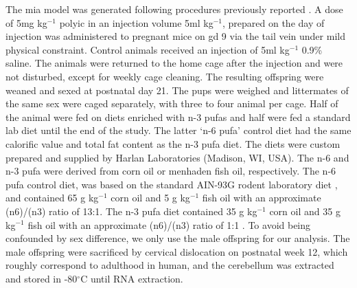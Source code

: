 The \gls{mia} model was generated following procedures previously reported \citep{Li2009c}. 
A dose of 5mg kg$^{-1}$ \gls{polyic} in an injection volume 5ml kg$^{-1}$, prepared on the day of injection was administered to pregnant mice on \gls{gd} 9 via the tail vein under mild physical constraint. 
Control animals received an injection of 5ml kg$^{-1}$ 0.9\% saline. 
The animals were returned to the home cage after the injection and were not disturbed, except for weekly cage cleaning.
The resulting offspring were weaned and sexed at postnatal day 21. 
The pups were weighed and littermates of the same sex were caged separately, with three to four animal per cage.
Half of the animal were fed on diets enriched with n-3 \glspl{pufa} and half were fed a standard  lab diet until the end of the study.
The latter `n-6 \gls{pufa}' control diet had the same calorific value and total fat content as the n-3 \gls{pufa} diet. 
The diets were custom prepared and supplied by Harlan Laboratories (Madison, WI, USA). 
The n-6 and n-3 \gls{pufa} were derived from corn oil or menhaden fish oil, respectively. 
The n-6 \gls{pufa} control diet, was based on the standard AIN-93G rodent laboratory diet \citep{Reeves1993}, and contained 65 g kg$^{-1}$ corn oil and 5 g kg$^{-1}$ fish oil with an approximate (n6)/(n3) ratio of 13:1. 
The n-3 \gls{pufa} diet contained 35 g kg$^{-1}$ corn oil and 35 g kg$^{-1}$ fish oil with an approximate (n6)/(n3) ratio of 1:1 \citep{Olivo2005}.
To avoid being confounded by sex difference, we only use the male offspring for our analysis.
The male offspring were sacrificed by cervical dislocation on postnatal week 12, which roughly correspond to adulthood in human, and the cerebellum was extracted and stored in -80$^{\circ}$C until RNA extraction.

